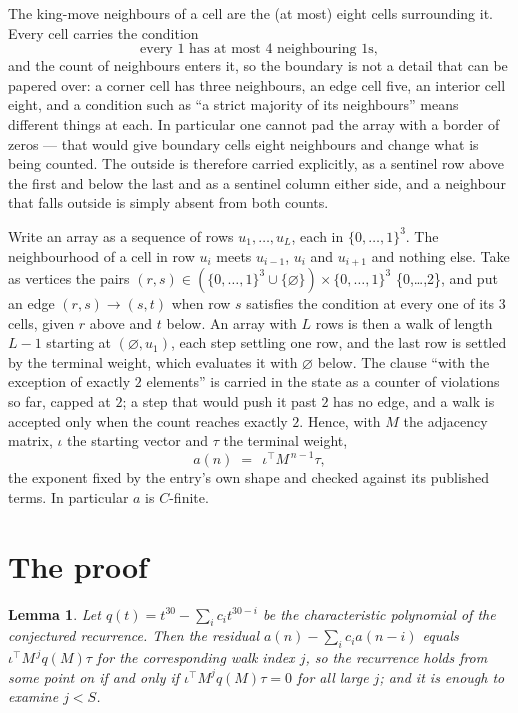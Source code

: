 \documentclass[11pt,a4paper]{article}
\theoremstyle{plain}
\newtheorem{lemma}[theorem]{Lemma}
\theoremstyle{definition}
\begin{document}
The king-move neighbours of a cell are the (at most) eight cells surrounding it. Every cell
carries the condition
\[
\text{every }1\text{ has at most }4\text{ neighbouring }1\text{s},
\]
and the count of neighbours enters it, so the boundary is not a detail that can be papered
over: a corner cell has three neighbours, an edge cell five, an interior cell eight, and a
condition such as ``a strict majority of its neighbours'' means different things at each. In
particular one cannot pad the array with a border of zeros --- that would give boundary cells
eight neighbours and change what is being counted. The outside is therefore carried
explicitly, as a sentinel row above the first and below the last and as a sentinel column
either side, and a neighbour that falls outside is simply absent from both counts.

Write an array as a sequence of rows $u_1,\dots,u_L$, each in
$\{0,\dots,1\}^{3}$. The neighbourhood of a cell in row $u_i$ meets $u_{i-1}$,
$u_i$ and $u_{i+1}$ and nothing else. Take as vertices the pairs
$(r,s)\in(\{0,\dots,1\}^{3}\cup\{\varnothing\})\times\{0,\dots,1\}^{3}$ \times \{0,\dots,2\},
and put an edge $(r,s)\to(s,t)$ when row $s$ satisfies the condition at every one of its
$3$ cells, given $r$ above and $t$ below. An array with $L$ rows is then a walk of length
$L-1$ starting at $(\varnothing,u_1)$, each step settling one row, and the last row is
settled by the terminal weight, which evaluates it with $\varnothing$ below. The clause ``with the exception of exactly $2$ elements'' is carried in
the state as a counter of violations so far, capped at $2$; a step that would push it past
$2$ has no edge, and a walk is accepted only when the count reaches exactly $2$. Hence,
with $M$ the adjacency matrix, $\iota$ the starting vector and $\tau$ the terminal weight,
\[
a(n)\;=\;\,\iota^{\!\top}M^{\,n-1}\tau ,
\]
the exponent fixed by the entry's own shape and checked against its published terms. In
particular $a$ is $C$-finite.

\section{The proof}

\begin{lemma}\label{lem:crit}
Let $q(t)=t^{30}-\sum_i c_it^{30-i}$ be the characteristic polynomial of the
conjectured recurrence. Then the residual $a(n)-\sum_ic_ia(n-i)$ equals
$\iota^{\!\top}M^{\,j}q(M)\tau$ for the corresponding walk index $j$, so the
recurrence holds from some point on if and only if $\iota^{\!\top}M^{j}q(M)\tau=0$ for all
large $j$; and it is enough to examine $j<S$.
\end{lemma}
\end{document}
